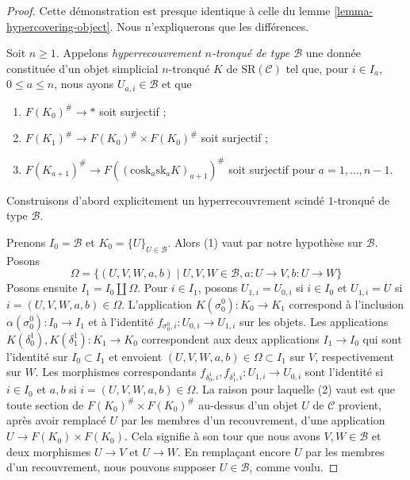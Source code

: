 \begin{proof}
Cette démonstration est presque identique à celle du
lemme \ref{lemma-hypercovering-object}. Nous
n'expliquerons que les différences.

\medskip\noindent
Soit $n \geq 1$. Appelons
{\it hyperrecouvrement $n$-tronqué de type $\mathcal{B}$}
une donnée constituée d'un objet simplicial
$n$-tronqué $K$ de $\text{SR}(\mathcal{C})$
tel que, pour $i \in I_a$, $0 \leq a \leq n$,
nous ayons $U_{a, i} \in \mathcal{B}$ et que
\begin{enumerate}
\item $F(K_0)^\# \to *$ soit surjectif ;
\item $F(K_1)^\# \to F(K_0)^\# \times F(K_0)^\#$ soit surjectif ;
\item $F(K_{a + 1})^\# \to F((\text{cosk}_a \text{sk}_a K)_{a + 1})^\#$
soit surjectif pour $a = 1, \ldots, n - 1$.
\end{enumerate}
Construisons d'abord explicitement un hyperrecouvrement scindé $1$-tronqué de type $\mathcal{B}$.

\medskip\noindent
Prenons $I_0 = \mathcal{B}$ et $K_0 = \{U\}_{U \in \mathcal{B}}$.
Alors (1) vaut par notre hypothèse sur $\mathcal{B}$. Posons
$$
\Omega =
\{(U, V, W, a, b) \mid U, V, W \in \mathcal{B}, a : U \to V, b : U \to W\}
$$
Posons ensuite $I_1 = I_0 \amalg \Omega$. Pour $i \in I_1$, posons
$U_{1, i} = U_{0, i}$ si $i \in I_0$ et $U_{1, i} = U$
si $i = (U, V, W, a, b) \in \Omega$. L'application
$K(\sigma^0_0) : K_0 \to K_1$ correspond à
l'inclusion $\alpha(\sigma^0_0) : I_0 \to I_1$
et à l'identité $f_{\sigma^0_0, i} : U_{0, i} \to U_{1, i}$
sur les objets. Les applications $K(\delta^1_0), K(\delta^1_1) : K_1 \to K_0$
correspondent aux deux applications $I_1 \to I_0$ qui sont
l'identité sur $I_0 \subset I_1$ et envoient $(U, V, W, a, b) \in \Omega \subset I_1$
sur $V$, respectivement sur $W$. Les morphismes correspondants
$f_{\delta^1_0, i}, f_{\delta^1_1, i} : U_{1, i} \to U_{0, i}$ sont
l'identité si $i \in I_0$ et $a, b$ si $i = (U, V, W, a, b) \in \Omega$.
La raison pour laquelle (2) vaut est que toute section de
$F(K_0)^\# \times F(K_0)^\#$ au-dessus d'un objet $U$ de $\mathcal{C}$
provient, après avoir remplacé $U$ par les membres d'un recouvrement,
d'une application $U \to F(K_0) \times F(K_0)$.
Cela signifie à son tour que nous avons $V, W \in \mathcal{B}$
et deux morphismes $U \to V$ et $U \to W$. En remplaçant encore
$U$ par les membres d'un recouvrement, nous pouvons supposer $U \in \mathcal{B}$,
comme voulu.


\end{proof}
